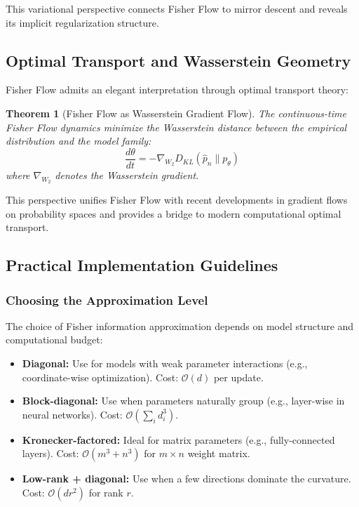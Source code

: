 \documentclass[11pt]{article}
\newtheorem{theorem}{Theorem}
\begin{document}
This variational perspective connects Fisher Flow to mirror descent \cite{nemirovski1983problem} and reveals its implicit regularization structure.

\subsection{Optimal Transport and Wasserstein Geometry}

Fisher Flow admits an elegant interpretation through optimal transport theory:

\begin{theorem}[Fisher Flow as Wasserstein Gradient Flow]
The continuous-time Fisher Flow dynamics minimize the Wasserstein distance between the empirical distribution and the model family:
\begin{equation}
\frac{d\theta}{dt} = -\nabla_{W_2} D_{KL}(\hat{p}_n \| p_\theta)
\end{equation}
where $\nabla_{W_2}$ denotes the Wasserstein gradient.
\end{theorem}

This perspective unifies Fisher Flow with recent developments in gradient flows on probability spaces \cite{ambrosio2008gradient} and provides a bridge to modern computational optimal transport.

\subsection{Practical Implementation Guidelines}

\subsubsection{Choosing the Approximation Level}

The choice of Fisher information approximation depends on model structure and computational budget:

\begin{itemize}
\item \textbf{Diagonal:} Use for models with weak parameter interactions (e.g., coordinate-wise optimization). Cost: $\mathcal{O}(d)$ per update.
\item \textbf{Block-diagonal:} Use when parameters naturally group (e.g., layer-wise in neural networks). Cost: $\mathcal{O}(\sum_i d_i^3)$.
\item \textbf{Kronecker-factored:} Ideal for matrix parameters (e.g., fully-connected layers). Cost: $\mathcal{O}(m^3 + n^3)$ for $m \times n$ weight matrix.
\item \textbf{Low-rank + diagonal:} Use when a few directions dominate the curvature. Cost: $\mathcal{O}(dr^2)$ for rank $r$.
\end{itemize}
\end{document}
